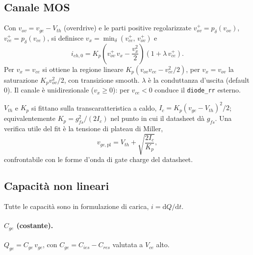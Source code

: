 \documentclass[11pt,a4paper]{article}
\newcommand{\ud}{\mathrm{d}}
\newcommand{\ssc}[1]{\texttt{#1}}
\begin{document}
\subsection{Canale MOS}

Con $v_{ov} = v_{ge} - V_{th}$ (overdrive) e le parti positive
regolarizzate $v_{ov}^{+} = p_\delta(v_{ov})$,
$v_{ce}^{+} = p_\delta(v_{ce})$, si definisce
$v_x = \min_\delta\!\left(v_{ce}^{+},\, v_{ov}^{+}\right)$ e
\begin{equation}
i_{ch,0} = K_p \left( v_{ov}^{+}\, v_x - \frac{v_x^2}{2} \right)
\left( 1 + \lambda\, v_{ce}^{+} \right).
\label{eq:channel}
\end{equation}
Per $v_x = v_{ce}$ si ottiene la regione lineare
$K_p ( v_{ov} v_{ce} - v_{ce}^2/2 )$, per $v_x = v_{ov}$ la saturazione
$K_p v_{ov}^2 / 2$, con transizione smooth. $\lambda$ \`e la
conduttanza d'uscita (default $0$). Il canale \`e unidirezionale
($v_x \ge 0$): per $v_{ce} < 0$ conduce il \ssc{diode\_rr} esterno.

$V_{th}$ e $K_p$ si fittano sulla transcaratteristica a caldo,
$I_c = K_p (v_{ge}-V_{th})^2/2$; equivalentemente
$K_p = g_{fs}^2/(2 I_c)$ nel punto in cui il datasheet d\`a $g_{fs}$.
Una verifica utile del fit \`e la tensione di plateau di Miller,
\begin{equation}
v_{ge,\mathrm{pl}} = V_{th} + \sqrt{\frac{2 I_c}{K_p}},
\end{equation}
confrontabile con le forme d'onda di gate charge del datasheet.

\subsection{Capacit\`a non lineari}

Tutte le capacit\`a sono in formulazione di carica, $i = \ud Q/\ud t$.

\paragraph{$C_{ge}$ (costante).}
$Q_{ge} = C_{ge}\, v_{ge}$, con
$C_{ge} = C_{ies} - C_{res}$ valutata a $V_{ce}$ alto.
\end{document}
